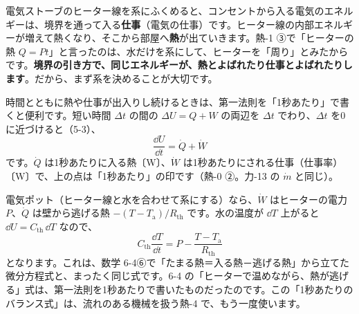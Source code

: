 電気ストーブのヒーター線を系にふくめると、コンセントから入る電気のエネルギーは、境界を通って入る\textbf{仕事}（電気の仕事）です。ヒーター線の内部エネルギーが増えて熱くなり、そこから部屋へ\textbf{熱}が出ていきます。熱-1 ③で「ヒーターの熱 $Q=Pt$」と言ったのは、水だけを系にして、ヒーターを「周り」とみたからです。\textbf{境界の引き方で、同じエネルギーが、熱とよばれたり仕事とよばれたりします}。だから、まず系を決めることが大切です。

\begin{motto}[3]
時間とともに熱や仕事が出入りし続けるときは、第一法則を「1秒あたり」で書くと便利です。短い時間 $\Delta t$ の間の $\Delta U=Q+W$ の両辺を $\Delta t$ でわり、$\Delta t$ を0に近づけると（5-3）、
\[\frac{\dd U}{\dd t}=\dot Q+\dot W\]
です。$\dot Q$ は1秒あたりに入る熱〔W〕、$\dot W$ は1秒あたりにされる仕事（仕事率）〔W〕で、上の点は「1秒あたり」の印です（熱-0 ②。力-13 の $\dot m$ と同じ）。

電気ポット（ヒーター線と水を合わせて系にする）なら、$\dot W$ はヒーターの電力 $P$、$\dot Q$ は壁から逃げる熱 $-(T-T_{\mathrm a})/R_{\mathrm{th}}$ です。水の温度が $\dd T$ 上がると $\dd U=C_{\mathrm{th}}\,\dd T$ なので、
\[C_{\mathrm{th}}\frac{\dd T}{\dd t}=P-\frac{T-T_{\mathrm a}}{R_{\mathrm{th}}}\]
となります。これは、数学 6-4⑥で「たまる熱＝入る熱－逃げる熱」から立てた微分方程式と、まったく同じ式です。6-4 の「ヒーターで温めながら、熱が逃げる」式は、第一法則を1秒あたりで書いたものだったのです。この「1秒あたりのバランス式」は、流れのある機械を扱う熱-4 で、もう一度使います。
\end{motto}

\begin{phflow}[第一法則から]
\end{phflow}

